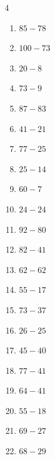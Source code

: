 \begin{multicols}{4}
\begin{enumerate}
  \item $85-78$
        \phantom{$=7$}

  \item $100-73$
        \phantom{$=27$}

  \item $20-8$
        \phantom{$=12$}

  \item $73-9$
        \phantom{$=64$}

  \item $87-83$
        \phantom{$=4$}

  \item $41-21$
        \phantom{$=20$}

  \item $77-25$
        \phantom{$=52$}

  \item $25-14$
        \phantom{$=11$}

  \item $60-7$
        \phantom{$=53$}

  \item $24-24$
        \phantom{$=0$}

  \item $92-80$
        \phantom{$=12$}

\columnbreak %

  \item $82-41$
        \phantom{$=41$}

  \item $62-62$
        \phantom{$=0$}

  \item $55-17$
        \phantom{$=38$}

  \item $73-37$
        \phantom{$=36$}

  \item $26-25$
        \phantom{$=1$}

  \item $45-40$
        \phantom{$=5$}

  \item $77-41$
        \phantom{$=36$}

  \item $64-41$
        \phantom{$=23$}

  \item $55-18$
        \phantom{$=37$}

  \item $69-27$
        \phantom{$=42$}

  \item $68-29$
        \phantom{$=39$}


\end{enumerate}
\end{multicols}
